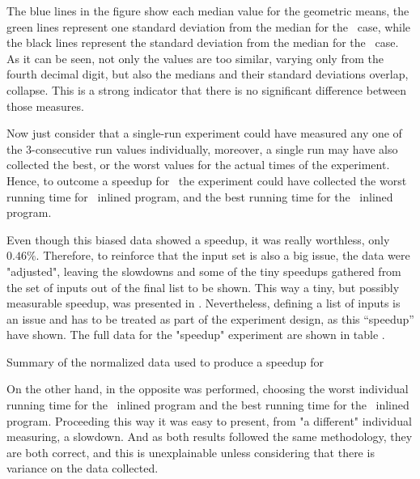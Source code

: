 The blue lines in the figure show each median value for the geometric means, the green lines represent one standard deviation from the median for the \FDI\ case, while the black lines represent the standard deviation from the median for the \llvm\ case. As it can be seen, not only the values are too similar, varying only from the fourth decimal digit, but also the medians and their standard deviations overlap, collapse. This is a strong indicator that there is no significant difference between those measures.

Now just consider that a single-run experiment could have measured any one of the $3$-consecutive run values individually, moreover, a single run may have also collected the best, or the worst values for the actual times of the experiment. Hence, to outcome a speedup for \FDI\, the experiment could have collected the worst running time for \llvm\ inlined program, and the best running time for the \FDI\ inlined program.


Even though this biased data showed a speedup, it was really worthless, only $0.46 \%$. Therefore, to reinforce that the input set is also a big issue, the data were "adjusted", leaving the slowdowns and some of the tiny speedups gathered from the set of inputs out of the final list to be shown. This way a tiny, but possibly measurable speedup, was presented in . Nevertheless, defining a list of inputs is an issue and has to be treated as part of the experiment design, as this ``speedup'' have shown. The full data for the "speedup" experiment are shown in table .

\begin{table}
  \centering
  \begin{tiny}
  
  \end{tiny}
  \caption{Summary of the normalized data used to produce a speedup for \bzip}
  \label{tab:fullexp}
\end{table}

On the other hand, in  the opposite was performed, choosing the worst individual running time for the \FDI\ inlined program and the best running time for the \llvm\ inlined program. Proceeding this way it was easy to present, from "a different" individual measuring, a slowdown. And as both results followed the same methodology, they are both correct, and this is unexplainable unless considering that there is variance on the data collected.

